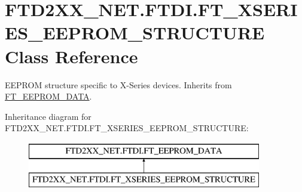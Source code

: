 \hypertarget{class_f_t_d2_x_x___n_e_t_1_1_f_t_d_i_1_1_f_t___x_s_e_r_i_e_s___e_e_p_r_o_m___s_t_r_u_c_t_u_r_e}{}\section{F\+T\+D2\+X\+X\+\_\+\+N\+E\+T.\+F\+T\+D\+I.\+F\+T\+\_\+\+X\+S\+E\+R\+I\+E\+S\+\_\+\+E\+E\+P\+R\+O\+M\+\_\+\+S\+T\+R\+U\+C\+T\+U\+RE Class Reference}
\label{class_f_t_d2_x_x___n_e_t_1_1_f_t_d_i_1_1_f_t___x_s_e_r_i_e_s___e_e_p_r_o_m___s_t_r_u_c_t_u_r_e}


E\+E\+P\+R\+OM structure specific to X-\/\+Series devices. Inherits from \mbox{\hyperlink{class_f_t_d2_x_x___n_e_t_1_1_f_t_d_i_1_1_f_t___e_e_p_r_o_m___d_a_t_a}{F\+T\+\_\+\+E\+E\+P\+R\+O\+M\+\_\+\+D\+A\+TA}}.  


Inheritance diagram for F\+T\+D2\+X\+X\+\_\+\+N\+E\+T.\+F\+T\+D\+I.\+F\+T\+\_\+\+X\+S\+E\+R\+I\+E\+S\+\_\+\+E\+E\+P\+R\+O\+M\+\_\+\+S\+T\+R\+U\+C\+T\+U\+RE\+:\begin{figure}[H]
\begin{center}
\leavevmode
\includegraphics[height=2.000000cm]{class_f_t_d2_x_x___n_e_t_1_1_f_t_d_i_1_1_f_t___x_s_e_r_i_e_s___e_e_p_r_o_m___s_t_r_u_c_t_u_r_e}
\end{center}
\end{figure}
